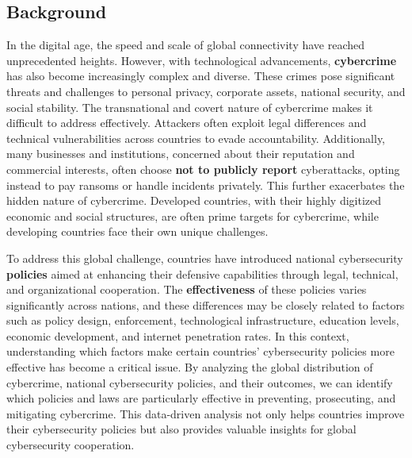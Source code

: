 
\subsection{Background}\label{subsec:background} %
	In the digital age, the speed and scale of global connectivity have reached unprecedented heights.
	However, with technological advancements, \textbf{cybercrime} has also become increasingly complex and diverse.
	These crimes pose significant threats and challenges to personal privacy, corporate assets, national security, and social stability.
	The transnational and covert nature of cybercrime makes it difficult to address effectively.
	Attackers often exploit legal differences and technical vulnerabilities across countries to evade accountability.
	Additionally, many businesses and institutions, concerned about their reputation and commercial interests,
	often choose \textbf{not to publicly report} cyberattacks, opting instead to pay ransoms or handle incidents privately.
	This further exacerbates the hidden nature of cybercrime.
	Developed countries, with their highly digitized economic and social structures, are often prime targets for cybercrime, while
	developing countries face their own unique challenges.

	To address this global challenge, countries have introduced national cybersecurity \textbf{policies}
	aimed at enhancing their defensive capabilities through legal, technical, and organizational cooperation.
	The \textbf{effectiveness} of these policies varies significantly across nations, and these differences may be closely related to factors
	such as policy design, enforcement, technological infrastructure, education levels, economic development, and internet penetration rates.
	In this context, understanding which factors make certain countries' cybersecurity policies more effective has become a critical issue.
	By analyzing the global distribution of cybercrime, national cybersecurity policies, and their outcomes,
	we can identify which policies and laws are particularly effective in preventing, prosecuting, and mitigating cybercrime.
	This data-driven analysis not only helps countries improve their cybersecurity policies
	but also provides valuable insights for global cybersecurity cooperation.
